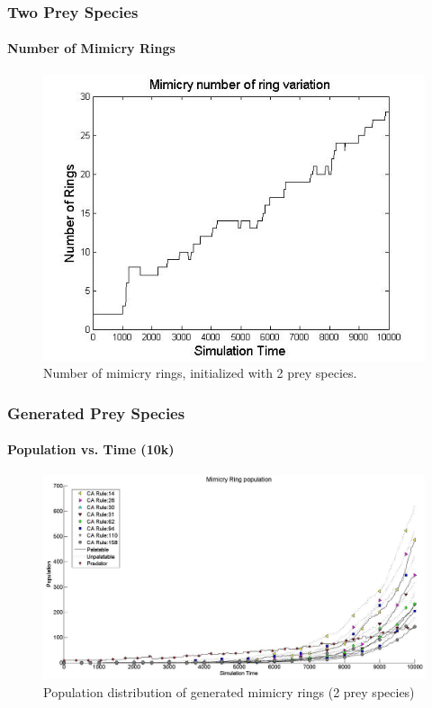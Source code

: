 \frame
{
	\frametitle{Two Prey Species}
	\framesubtitle{Number of Mimicry Rings}

	\begin{figure}[H]
		\centering
		\includegraphics[scale=0.30]{../tex/images/ringSize10k-2Prey}
		\caption{Number of mimicry rings, initialized with 2 prey species.}
		\label{fig:ringSize10k-2Prey}
	\end{figure}	
}

\frame
{
	\frametitle{Generated Prey Species}
	\framesubtitle{Population vs. Time (10k)}
	
	\begin{figure}[H]
		\centering
		\includegraphics[scale=0.25]{../tex/images/simTime10k-2Prey-generated-prey}
		\caption{Population distribution of generated mimicry rings (2 prey species)}
		\label{fig:plot-2-prey-generated-prey}
	\end{figure}
}

